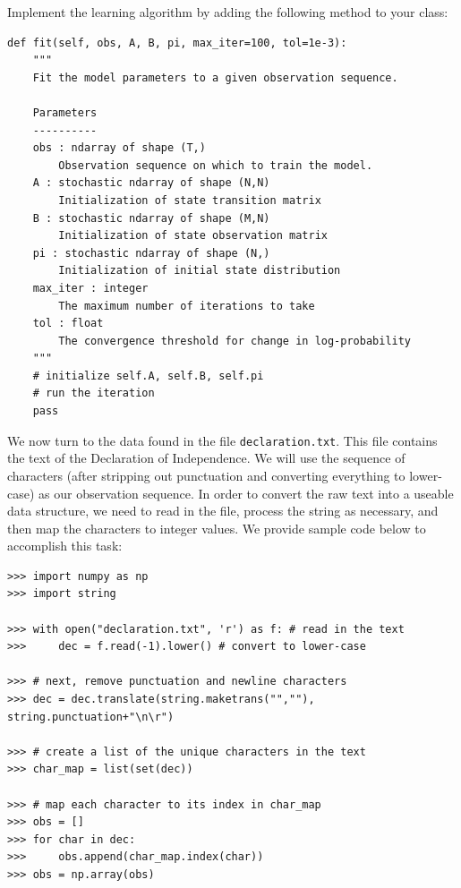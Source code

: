 \begin{problem}
Implement the learning algorithm by adding the following method to your class:
\begin{lstlisting}
def fit(self, obs, A, B, pi, max_iter=100, tol=1e-3):
    """
    Fit the model parameters to a given observation sequence.

    Parameters
    ----------
    obs : ndarray of shape (T,)
        Observation sequence on which to train the model.
    A : stochastic ndarray of shape (N,N)
        Initialization of state transition matrix
    B : stochastic ndarray of shape (M,N)
        Initialization of state observation matrix
    pi : stochastic ndarray of shape (N,)
        Initialization of initial state distribution
    max_iter : integer
        The maximum number of iterations to take
    tol : float
        The convergence threshold for change in log-probability
    """
    # initialize self.A, self.B, self.pi
    # run the iteration
    pass
\end{lstlisting}
\end{problem}

We now turn to the data found in the file {\tt declaration.txt}.
This file contains the text of the Declaration of Independence.
We will use the sequence of characters (after stripping out punctuation and converting everything to lower-case) as our observation sequence.
In order to convert the raw text into a useable data structure, we need to read in the file, process the string as necessary, and then map the characters to integer values.
We provide sample code below to accomplish this task:
\begin{lstlisting}
>>> import numpy as np
>>> import string

>>> with open("declaration.txt", 'r') as f: # read in the text
>>>     dec = f.read(-1).lower() # convert to lower-case

>>> # next, remove punctuation and newline characters
>>> dec = dec.translate(string.maketrans("",""), string.punctuation+"\n\r")

>>> # create a list of the unique characters in the text
>>> char_map = list(set(dec))

>>> # map each character to its index in char_map
>>> obs = []
>>> for char in dec:
>>>     obs.append(char_map.index(char))
>>> obs = np.array(obs)
\end{lstlisting}


